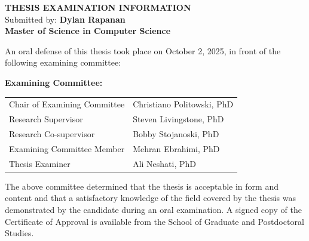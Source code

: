 \begin{center}
    \textbf{\Large THESIS EXAMINATION INFORMATION}\\
    Submitted by: \textbf{Dylan Rapanan}\\[1em]
    \textbf{Master of Science in Computer Science}\\[2em]
\end{center}

\begin{center}
\end{center}
\vspace{2em}

An oral defense of this thesis took place on October 2, 2025, in front of the following examining committee:

\vspace{1em}

\noindent
\textbf{Examining Committee:}

\vspace{1em}

\begin{tabular}{>{\raggedright}p{2.8in}p{3in}}
Chair of Examining Committee & Christiano Politowski, PhD \\
Research Supervisor & Steven Livingstone, PhD \\
Research Co-supervisor & Bobby Stojanoski, PhD \\
Examining Committee Member & Mehran Ebrahimi, PhD \\
Thesis Examiner & Ali Neshati, PhD \\
\end{tabular}

\vspace{2em}

\noindent
The above committee determined that the thesis is acceptable in form and content and that a satisfactory knowledge of the field covered by the thesis was demonstrated by the candidate during an oral examination. A signed copy of the Certificate of Approval is available from the School of Graduate and Postdoctoral Studies.
\newpage